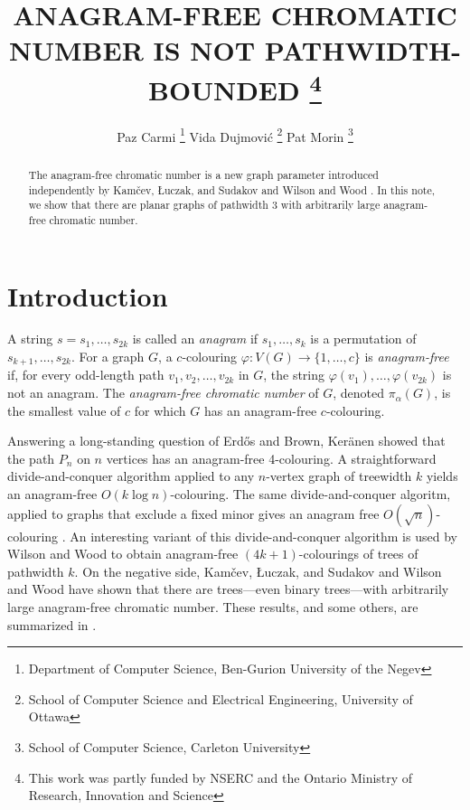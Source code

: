 \documentclass{patmorin}
\title{\MakeUppercase{Anagram-Free Chromatic Number is not Pathwidth-Bounded}%
   \thanks{This work was partly funded by NSERC and the Ontario Ministry of
    Research, Innovation and Science}}
\author{Paz Carmi%
   \thanks{Department of Computer Science,
           Ben-Gurion University of the Negev}\quad%
   Vida Dujmović%
   \thanks{School of Computer Science and Electrical Engineering, 
           University of Ottawa}\quad%
   Pat Morin%
   \thanks{School of Computer Science, Carleton University}}%
\begin{document}
\maketitle
%
\begin{abstract}
  The anagram-free chromatic number is a new graph parameter
  introduced independently by Kamčev, Łuczak, and Sudakov
  \cite{kamcev.luczak.ea:anagram-free} and Wilson and Wood
  \cite{wilson.wood:anagram-free}.  In this note, we show that there
  are planar graphs of pathwidth 3 with arbitrarily large anagram-free
  chromatic number.
\end{abstract}
%
%


\section{Introduction}

A string $s=s_1,\ldots,s_{2k}$ is called an \emph{anagram} if
$s_1,\ldots,s_k$ is a permutation of $s_{k+1},\ldots,s_{2k}$.
For a graph $G$, a $c$-colouring $\varphi:V(G)\to\{1,\ldots,c\}$ is
\emph{anagram-free} if, for every odd-length path $v_1,v_2,\ldots,v_{2k}$
in $G$, the string $\varphi(v_1),\ldots,\varphi(v_{2k})$ is not an
anagram.  The \emph{anagram-free chromatic number} of $G$, denoted
$\pi_\alpha(G)$, is the smallest value of $c$ for which $G$ has an
anagram-free $c$-colouring.

Answering a long-standing question of Erd\H{o}s and Brown, Ker\"anen
\cite{keranen:abelian} showed that the path $P_n$ on $n$ vertices has an
anagram-free 4-colouring.  A straightforward divide-and-conquer
algorithm applied to any $n$-vertex graph of treewidth $k$ yields
an anagram-free $O(k\log n)$-colouring.  The same divide-and-conquer
algoritm, applied to graphs that exclude a fixed minor gives an anagram
free $O(\sqrt{n})$-colouring \cite{kamcev.luczak.ea:anagram-free}.
An interesting variant of this divide-and-conquer algorithm is used by
Wilson and Wood \cite{wilson.wood:anagram-free} to obtain anagram-free
$(4k+1)$-colourings of trees of pathwidth $k$.  On the negative side,
Kamčev, Łuczak, and Sudakov \cite{kamcev.luczak.ea:anagram-free} and
Wilson and Wood \cite{wilson.wood:anagram-free} have shown that there
are trees---even binary trees---with arbitrarily large anagram-free
chromatic number.  These results, and some others, are summarized in
.
\end{document}
